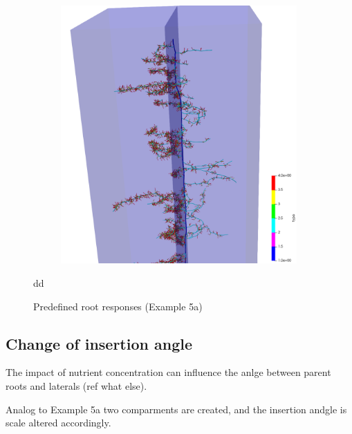 \begin{figure}
\begin{subfigure}[c]{0.3\textwidth}
 \label{fig:insertion}
\end{subfigure}
\begin{subfigure}[c]{0.3\textwidth}
\includegraphics[width=0.99\textwidth]{example5d.png}
 \label{fig:probability}
\end{subfigure}dd
\caption{Predefined root responses (Example 5a)}
\end{figure}



\subsection{Change of insertion angle} \label{sec:insertion_angle}

The impact of nutrient concentration can influence the anlge between parent roots and laterals (ref what else).

Analog to Example 5a two comparments are created, and the insertion andgle is scale altered accordingly.



